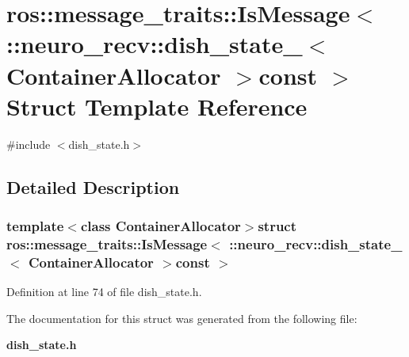 \section{ros\-:\-:message\-\_\-traits\-:\-:\-Is\-Message$<$ \-:\-:neuro\-\_\-recv\-:\-:dish\-\_\-state\-\_\-$<$ \-Container\-Allocator $>$const $>$ \-Struct \-Template \-Reference}
\label{structros_1_1message__traits_1_1IsMessage_3_01_1_1neuro__recv_1_1dish__state___3_01ContainerAllocator_01_4const_01_01_4}


{\ttfamily \#include $<$dish\-\_\-state.\-h$>$}



\subsection{\-Detailed \-Description}
\subsubsection*{template$<$class Container\-Allocator$>$struct ros\-::message\-\_\-traits\-::\-Is\-Message$<$ \-::neuro\-\_\-recv\-::dish\-\_\-state\-\_\-$<$ Container\-Allocator $>$const  $>$}



\-Definition at line 74 of file dish\-\_\-state.\-h.



\-The documentation for this struct was generated from the following file\-:\begin{DoxyCompactItemize}
\item 
{\bf dish\-\_\-state.\-h}\end{DoxyCompactItemize}
